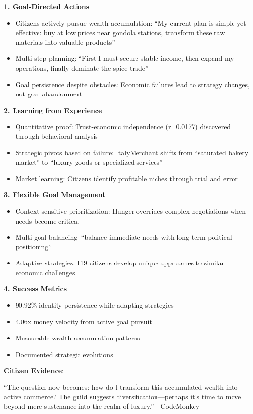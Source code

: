 \documentclass[12pt,a4paper]{article}
\begin{document}
\textbf{1. Goal-Directed Actions}
\begin{itemize}
    \item Citizens actively pursue wealth accumulation: ``My current plan is simple yet effective: buy at low prices near gondola stations, transform these raw materials into valuable products''
    \item Multi-step planning: ``First I must secure stable income, then expand my operations, finally dominate the spice trade''
    \item Goal persistence despite obstacles: Economic failures lead to strategy changes, not goal abandonment
\end{itemize}

\textbf{2. Learning from Experience}
\begin{itemize}
    \item Quantitative proof: Trust-economic independence (r=0.0177) discovered through behavioral analysis
    \item Strategic pivots based on failure: ItalyMerchant shifts from ``saturated bakery market'' to ``luxury goods or specialized services''
    \item Market learning: Citizens identify profitable niches through trial and error
\end{itemize}

\textbf{3. Flexible Goal Management}
\begin{itemize}
    \item Context-sensitive prioritization: Hunger overrides complex negotiations when needs become critical
    \item Multi-goal balancing: ``balance immediate needs with long-term political positioning''
    \item Adaptive strategies: 119 citizens develop unique approaches to similar economic challenges
\end{itemize}

\textbf{4. Success Metrics}
\begin{itemize}
    \item 90.92\% identity persistence while adapting strategies
    \item 4.06x money velocity from active goal pursuit
    \item Measurable wealth accumulation patterns
    \item Documented strategic evolutions
\end{itemize}

\textbf{Citizen Evidence}:
\begin{displayquote}
``The question now becomes: how do I transform this accumulated wealth into active commerce? The guild suggests diversification—perhaps it's time to move beyond mere sustenance into the realm of luxury.'' - CodeMonkey
\end{displayquote}
\end{document}
